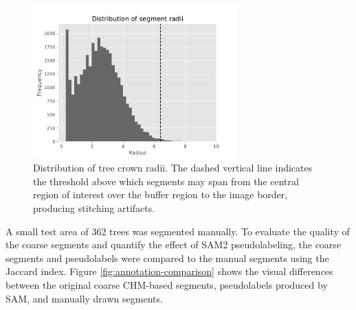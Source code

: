 \documentclass[english, 12pt, a4paper, sci, utf8, a-2b, online]{aaltothesis}
\begin{document}
\begin{figure}[h]
    \centering
    \includegraphics[width=0.7\textwidth]{figures/radii.pdf}
    \caption{Distribution of tree crown radii. The dashed vertical line indicates the threshold above which segments may span from the central region of interest over the buffer region to the image border, producing stitching artifacts.}
    \label{fig:radii}
\end{figure}

A small test area of 362 trees was segmented manually. To evaluate the quality of the coarse segments and quantify the effect of SAM2 pseudolabeling, the coarse segments and pseudolabels were compared to the manual segments using the Jaccard index. Figure \ref{fig:annotation-comparison} shows the visual differences between the original coarse CHM-based segments, pseudolabels produced by SAM, and manually drawn segments.
\end{document}
